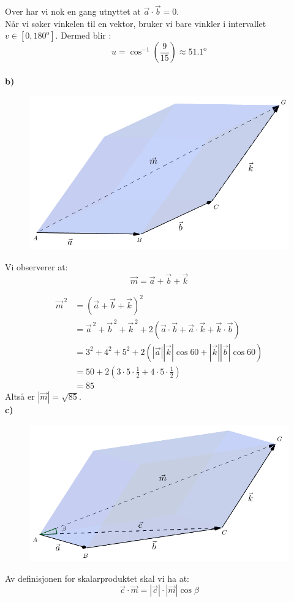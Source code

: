 \documentclass[english, 11 pt]{report}
\begin{document}
Over har vi nok en gang utnyttet at $ \vec a \cdot \vec b = 0 $. \\

Når vi søker vinkelen til en vektor, bruker vi bare vinkler i intervallet $ v \in [0,180^\mathrm{o}] $. Dermed blir :
\[u  = \cos^{-1} \left(\frac{9}{15}\right) \approx 51.1^\mathrm{o}  \] \\

\textbf{b)} 
\begin{figure}[H]
	\centering
	\includegraphics[scale=0.5]{fig2}
\end{figure}
Vi observerer at:
\begin{equation}
\vec{m} = \vec{a} + \vec b + \vec k \label{vek2}
\end{equation}

\begin{align*}
\vec{m}^{\,2} &= \left(\vec{a} + \vec b + \vec k\right)^2  \\
&= \vec{a}^{\,2} + \vec{b}^{\,2} + \vec{k}^{\,2} + 2\left( \vec a \cdot \vec b+ \vec a \cdot\vec k +\vec k \cdot \vec b  \right) \\
&= 3^2 + 4^2 + 5^2+ 2 \left(|\vec a| |\vec k| \cos 60 +|\vec k| |\vec b| \cos 60\right)  \\
& = 50 + 2 \left(3\cdot 5 \cdot \frac{1}{2} + 4\cdot 5 \cdot \frac{1}{2}\right) \\
& = 85
\end{align*}
Altså er $ |\vec m|=\sqrt{85} $. \\

\textbf{c)}

\begin{figure}[H]
	\centering
	\includegraphics[scale=0.5]{fig4}
\end{figure}
Av definisjonen for skalarproduktet skal vi ha at:
\[ \vec c \cdot \vec m = |\vec c| \cdot |\vec m| \cos \beta \]
\end{document}
